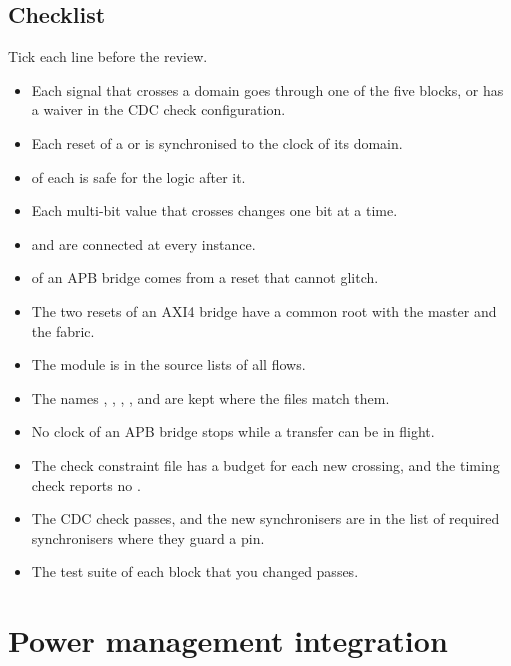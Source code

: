 \section{Checklist}\label{um:ch:cdc-integration:checklist}
Tick each line before the review.
\begin{itemize}
  \item[$\square$] Each signal that crosses a domain goes through one of the five blocks, or has a waiver in the CDC check configuration.
  \item[$\square$] Each reset of a  or  is synchronised to the clock of its domain.
  \item[$\square$]  of each  is safe for the logic after it.
  \item[$\square$] Each multi-bit value that crosses  changes one bit at a time.
  \item[$\square$]  and  are connected at every instance.
  \item[$\square$]  of an APB bridge comes from a reset that cannot glitch.
  \item[$\square$] The two resets of an AXI4 bridge have a common root with the master and the fabric.
  \item[$\square$] The module is in the source lists of all flows.
  \item[$\square$] The names , , , ,  and  are kept where the files match them.
  \item[$\square$] No clock of an APB bridge stops while a transfer can be in flight.
  \item[$\square$] The check constraint file has a budget for each new crossing, and the timing check reports no .
  \item[$\square$] The CDC check passes, and the new synchronisers are in the list of required synchronisers where they guard a pin.
  \item[$\square$] The test suite of each block that you changed passes.
\end{itemize}

\chapter{Power management integration}\label{um:ch:power-integration}

